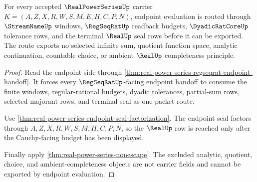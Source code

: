 \begin{theorem}
\label{thm:real-power-series-endpoint-cauchy-budget}
For every accepted $\RealPowerSeriesUp$ carrier $K=(A,Z,X,R,W,S,M,E,H,C,P,N)$, endpoint evaluation is routed through $\StreamNameUp$ windows, $\RegSeqRatUp$ readback budgets, $\DyadicRatCoreUp$ tolerance rows, and the terminal $\RealUp$ seal rows before it can be exported. The route exports no selected infinite sum, quotient function space, analytic continuation, countable choice, or ambient $\RealUp$ completeness principle.
\end{theorem}
\begin{proof}
Read the endpoint side through \autoref{thm:real-power-series-regseqrat-endpoint-handoff}. It forces every $\RegSeqRatUp$-facing endpoint handoff to consume the finite windows, regular-rational budgets, dyadic tolerances, partial-sum rows, selected majorant rows, and terminal seal as one packet route.

Use \autoref{thm:real-power-series-endpoint-seal-factorization}. The endpoint seal factors through $A,Z,X,R,W,S,M,H,C,P,N$, so the $\RealUp$ row is reached only after the Cauchy-facing budget has been displayed.

Finally apply \autoref{thm:real-power-series-nonescape}. The excluded analytic, quotient, choice, and ambient-completeness objects are not carrier fields and cannot be exported by endpoint evaluation.
\end{proof}

